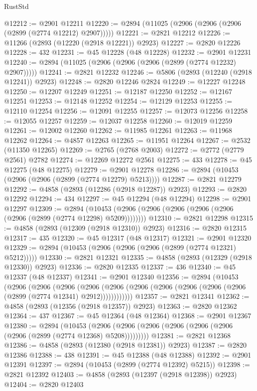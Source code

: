 \begin{lexlean}{RustStd}
\begin{coremodule}
@12212 := @2901 @12211
@12220 := @2894 (@11025 (@2906 (@2906 (@2906 (@2899 (@2774 @12212) @2907)))))
@12221 := @2821 @12212
@12226 := @11266 (@2893 (@12220 (@2918 @12221)) @2923)
@12227 := @2820 @12226
@12228 := 432
@12231 := @45 @12228 (@48 @12228)
@12232 := @2901 @12231
@12240 := @2894 (@11025 (@2906 (@2906 (@2906 (@2899 (@2774 @12232) @2907)))))
@12241 := @2821 @12232
@12246 := @5806 (@2893 (@12240 (@2918 @12241)) @2923)
@12248 := @2820 @12246 @2824
@12249 := @12227 @12248
@12250 := @12207 @12249
@12251 := @12187 @12250
@12252 := @12167 @12251
@12253 := @12148 @12252
@12254 := @12129 @12253
@12255 := @12110 @12254
@12256 := @12091 @12255
@12257 := @12073 @12256
@12258 := @12055 @12257
@12259 := @12037 @12258
@12260 := @12019 @12259
@12261 := @12002 @12260
@12262 := @11985 @12261
@12263 := @11968 @12262
@12264 := @4857 @12263
@12265 := @11951 @12264
@12267 := @2532 (@11350 @12265)
@12269 := @2765 (@2768 @2003)
@12272 := @2772 (@2779 @2561) @2782
@12274 := @12269 @12272 @2561
@12275 := 433
@12278 := @45 @12275 (@48 @12275)
@12279 := @2901 @12278
@12286 := @2894 (@10453 (@2906 (@2906 (@2899 (@2774 @12279) @5213))))
@12287 := @2821 @12279
@12292 := @4858 (@2893 (@12286 (@2918 @12287)) @2923)
@12293 := @2820 @12292
@12294 := 434
@12297 := @45 @12294 (@48 @12294)
@12298 := @2901 @12297
@12309 := @2894
    (@10453 (@2906 (@2906 (@2906 (@2906 (@2906 (@2906 (@2899 (@2774 @12298) @5209))))))))
@12310 := @2821 @12298
@12315 := @4858 (@2893 (@12309 (@2918 @12310)) @2923)
@12316 := @2820 @12315
@12317 := 435
@12320 := @45 @12317 (@48 @12317)
@12321 := @2901 @12320
@12329 := @2894 (@10453 (@2906 (@2906 (@2906 (@2899 (@2774 @12321) @5212)))))
@12330 := @2821 @12321
@12335 := @4858 (@2893 (@12329 (@2918 @12330)) @2923)
@12336 := @2820 @12335
@12337 := 436
@12340 := @45 @12337 (@48 @12337)
@12341 := @2901 @12340
@12356 := @2894
    (@10453
      (@2906
        (@2906
          (@2906
            (@2906 (@2906 (@2906 (@2906 (@2906 (@2906 (@2906 (@2899 (@2774 @12341) @2912))))))))))))
@12357 := @2821 @12341
@12362 := @4858 (@2893 (@12356 (@2918 @12357)) @2923)
@12363 := @2820 @12362
@12364 := 437
@12367 := @45 @12364 (@48 @12364)
@12368 := @2901 @12367
@12380 := @2894
    (@10453 (@2906 (@2906 (@2906 (@2906 (@2906 (@2906 (@2906 (@2899 (@2774 @12368) @5208)))))))))
@12381 := @2821 @12368
@12386 := @4858 (@2893 (@12380 (@2918 @12381)) @2923)
@12387 := @2820 @12386
@12388 := 438
@12391 := @45 @12388 (@48 @12388)
@12392 := @2901 @12391
@12397 := @2894 (@10453 (@2899 (@2774 @12392) @5215))
@12398 := @2821 @12392
@12403 := @4858 (@2893 (@12397 (@2918 @12398)) @2923)
@12404 := @2820 @12403

\end{coremodule}
\end{lexlean}
